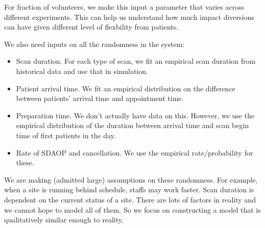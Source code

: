 For fraction of volunteers, we make this input a parameter that
varies across different experiments. This can help us understand
how much impact diversions can have given different level of
flexbility from patients.

We also need inputs on all the randomness in the system:
\begin{itemize}
\item Scan duration. For each type of scan, we fit an empirical
scan duration from historical data and use that in simulation.
\item Patient arrival time. We fit an empirical distribution on
the difference between patients' arrival time and appointment time.
\item Preparation time. We don't actually have data on this. However,
we use the empirical distribution of the duration between arrival time
and scan begin time of first patients in the day.
\item Rate of SDAOP and cancellation. We use the empirical rate/probability
for these.
\end{itemize}
We are making (admitted large) assumptions on these randomness.
For example, when a site is running behind schedule, staffs
may work faster. Scan duration is dependent on the current status
of a site. There are lots of factors in reality and we cannot
hope to model all of them. So we focus on constructing a model
that is qualitatively similar enough to reality.
